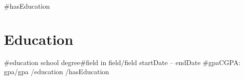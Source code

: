 {{#hasEducation}}
\section{Education}
\resumeSubHeadingListStart
  {{#education}}
  \resumeEducationSubheading
    { {{school}} }
    { {{degree}}{{#field}} in {{field}}{{/field}} }
    { {{startDate}} -- {{endDate}} }
    { {{#gpa}}CGPA: {{gpa}}{{/gpa}} }
  {{/education}}
\resumeSubHeadingListEnd
{{/hasEducation}}

